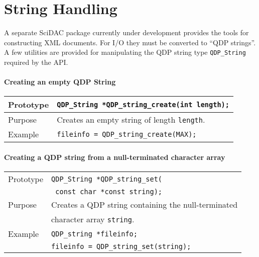 \documentclass{article}
\newcommand{\QMDhandle}{{\tt QDP\_String }}
\begin{document}
\section{String Handling}

A separate SciDAC package currently under development provides the
tools for constructing XML documents.  For I/O they must be converted
to ``QDP strings''.  A few utilities are provided for manipulating the
QDP string type \QMDhandle required by the API\@.

\paragraph{Creating an empty QDP String}

\begin{flushleft}
  \begin{tabular}{|l|l|}
  \hline
  Prototype      & \QMDhandle \verb|*QDP_string_create(int length);|\\
    \hline
  Purpose        & Creates an empty string of length \verb|length|. \\
   \hline
  Example        & \verb|fileinfo = QDP_string_create(MAX);| \\
   \hline
 \end{tabular}
\end{flushleft}
%
\paragraph{Creating a QDP string from a null-terminated character array}

\begin{flushleft}
  \begin{tabular}{|l|l|}
  \hline
  Prototype      & \QMDhandle \verb|*QDP_string_set(| \\
                 & \verb| const char *const string);|\\
    \hline
  Purpose        & Creates a QDP string containing the null-terminated \\
                 & character array \verb|string|. \\
   \hline
  Example        & \verb|QDP_string *fileinfo;| \\
                 & \verb|fileinfo = QDP_string_set(string);| \\
   \hline
 \end{tabular}
\end{flushleft}
%
\end{document}
